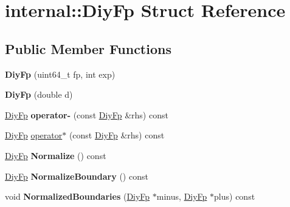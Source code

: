 \hypertarget{structinternal_1_1_diy_fp}{}\section{internal\+:\+:Diy\+Fp Struct Reference}
\label{structinternal_1_1_diy_fp}
\subsection*{Public Member Functions}
\begin{DoxyCompactItemize}
\item 
{\bfseries Diy\+Fp} (uint64\+\_\+t fp, int exp)\hypertarget{structinternal_1_1_diy_fp_a9a8f2f5c49dfa0dee4a527f0829cc2e5}{}\label{structinternal_1_1_diy_fp_a9a8f2f5c49dfa0dee4a527f0829cc2e5}

\item 
{\bfseries Diy\+Fp} (double d)\hypertarget{structinternal_1_1_diy_fp_adc132c7da4c8e3ee5ae12efdcf6dbf7c}{}\label{structinternal_1_1_diy_fp_adc132c7da4c8e3ee5ae12efdcf6dbf7c}

\item 
\hyperlink{structinternal_1_1_diy_fp}{Diy\+Fp} {\bfseries operator-\/} (const \hyperlink{structinternal_1_1_diy_fp}{Diy\+Fp} \&rhs) const \hypertarget{structinternal_1_1_diy_fp_ade3efb95107203f2327fc3d5a802d4b7}{}\label{structinternal_1_1_diy_fp_ade3efb95107203f2327fc3d5a802d4b7}

\item 
\hyperlink{structinternal_1_1_diy_fp}{Diy\+Fp} \hyperlink{structinternal_1_1_diy_fp_ab536022d225b3014c98517a2dec4b986}{operator$\ast$} (const \hyperlink{structinternal_1_1_diy_fp}{Diy\+Fp} \&rhs) const 
\item 
\hyperlink{structinternal_1_1_diy_fp}{Diy\+Fp} {\bfseries Normalize} () const \hypertarget{structinternal_1_1_diy_fp_adae1948b1bb65d950cd3801a4a2bb7fd}{}\label{structinternal_1_1_diy_fp_adae1948b1bb65d950cd3801a4a2bb7fd}

\item 
\hyperlink{structinternal_1_1_diy_fp}{Diy\+Fp} {\bfseries Normalize\+Boundary} () const \hypertarget{structinternal_1_1_diy_fp_a1a4589d19230c9930d7f3dd5a9b7f7e7}{}\label{structinternal_1_1_diy_fp_a1a4589d19230c9930d7f3dd5a9b7f7e7}

\item 
void {\bfseries Normalized\+Boundaries} (\hyperlink{structinternal_1_1_diy_fp}{Diy\+Fp} $\ast$minus, \hyperlink{structinternal_1_1_diy_fp}{Diy\+Fp} $\ast$plus) const \hypertarget{structinternal_1_1_diy_fp_a64e623c1742d1d5ad551ab456f0deb62}{}\label{structinternal_1_1_diy_fp_a64e623c1742d1d5ad551ab456f0deb62}


\end{DoxyCompactItemize}
